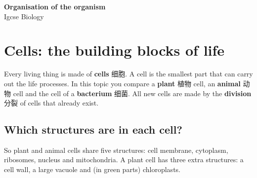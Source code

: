 \documentclass[11pt]{article}
\begin{document}
\begin{center}
  {\LARGE\bfseries Organisation of the organism}\\[0.35em]
  {\large Igcse Biology}
\end{center}
\vspace{0.6em}

\section*{Cells: the building blocks of life}

Every living thing is made of \textbf{cells} 细胞. A cell is the smallest part that can carry out the life processes. In this topic you compare a \textbf{plant} 植物 cell, an \textbf{animal} 动物 cell and the cell of a \textbf{bacterium} 细菌. All new cells are made by the \textbf{division} 分裂 of cells that already exist.

\subsection*{Which structures are in each cell?}

\begin{center}
\end{center}

So plant and animal cells share five structures: cell membrane, cytoplasm, ribosomes, nucleus and mitochondria. A plant cell has three extra structures: a cell wall, a large vacuole and (in green parts) chloroplasts.
\end{document}
